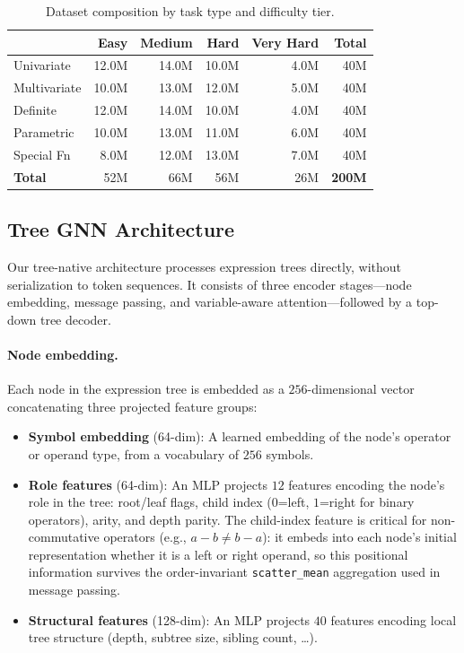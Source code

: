 \documentclass{article}
\begin{document}
\begin{table}[t]
	\centering
	\caption{Dataset composition by task type and difficulty tier.}
	\label{tab:dataset}
	\small
	\begin{tabular}{lrrrrr}
		\toprule
		               & Easy & Medium & Hard & Very Hard & Total         \\
		\midrule
		Univariate     & 12.0M & 14.0M & 10.0M & 4.0M      & 40M           \\
		Multivariate   & 10.0M & 13.0M & 12.0M & 5.0M      & 40M           \\
		Definite       & 12.0M & 14.0M & 10.0M & 4.0M      & 40M           \\
		Parametric     & 10.0M & 13.0M & 11.0M & 6.0M      & 40M           \\
		Special Fn     & 8.0M  & 12.0M & 13.0M & 7.0M      & 40M           \\
		\midrule
		\textbf{Total} & 52M   & 66M   & 56M   & 26M       & \textbf{200M} \\
		\bottomrule
	\end{tabular}
\end{table}


\subsection{Tree GNN Architecture}
\label{sec:tree_model}

Our tree-native architecture processes expression trees directly, without
serialization to token sequences. It consists of three encoder stages---node
embedding, message passing, and variable-aware attention---followed by a
top-down tree decoder.

\paragraph{Node embedding.} Each node in the expression tree is embedded as
a $256$-dimensional vector concatenating three projected feature groups:
\begin{itemize}
	\item \textbf{Symbol embedding} (64-dim): A learned embedding of the
	      node's operator or operand type, from a vocabulary of $256$ symbols.
	\item \textbf{Role features} (64-dim): An MLP projects $12$ features
	      encoding the node's role in the tree: root/leaf flags, child index
	      ($0$=left, $1$=right for binary operators), arity, and depth parity.
	      The child-index feature is critical for non-commutative operators
	      (e.g., $a - b \neq b - a$): it embeds into each node's initial
	      representation whether it is a left or right operand, so this
	      positional information survives the order-invariant
	      \texttt{scatter\_mean} aggregation used in message passing.
	\item \textbf{Structural features} (128-dim): An MLP projects $40$
	      features encoding local tree structure (depth, subtree size, sibling
	      count, \ldots).
\end{itemize}
\end{document}
